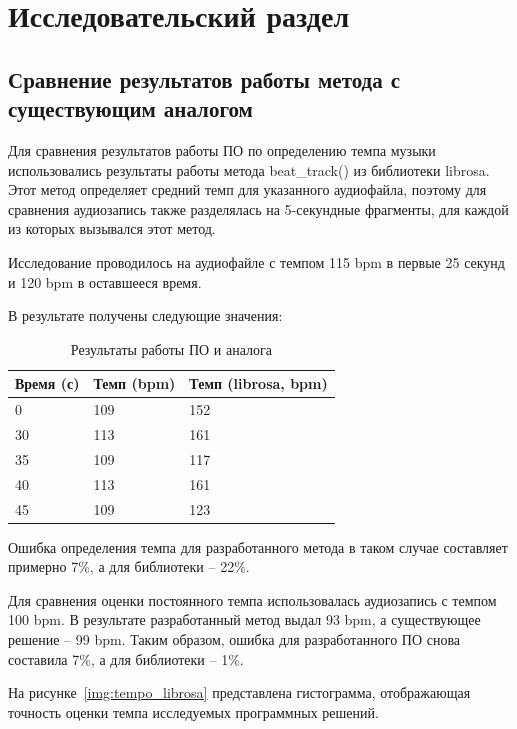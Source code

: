 \section{Исследовательский раздел}

\subsection{Сравнение результатов работы метода с существующим аналогом}

Для сравнения результатов работы ПО по определению темпа музыки использовались результаты работы метода beat\_track() из библиотеки librosa. Этот метод определяет средний темп для указанного аудиофайла, поэтому для сравнения аудиозапись также разделялась на 5-секундные фрагменты, для каждой из которых вызывался этот метод.

Исследование проводилось на аудиофайле с темпом 115 bpm в первые 25 секунд и 120 bpm в оставшееся время.

В результате получены следующие значения:

\begin{table}[!h]
	\begin{center}
		\caption{\label{tab:compare_res}Результаты работы ПО и аналога}
		\begin{tabular}{|p{3.5cm}|p{6cm}|p{6cm}|}
			\hline
			Время (с) & Темп (bpm) & Темп (librosa, bpm)\\
			\hline
			0 & 109 & 152\\
			\hline
			30 & 113 & 161\\
			\hline
			35 & 109 & 117\\
			\hline
			40 & 113 & 161\\
			\hline
			45 & 109 & 123\\
			\hline
		\end{tabular}
	\end{center}
\end{table}

Ошибка определения темпа для разработанного метода в таком случае составляет примерно 7\%, а для библиотеки -- 22\%.

Для сравнения оценки постоянного темпа использовалась аудиозапись с темпом 100 bpm. В результате разработанный метод выдал 93 bpm, а существующее решение -- 99 bpm. Таким образом, ошибка для разработанного ПО снова составила 7\%, а для библиотеки -- 1\%.

На рисунке~\ref{img:tempo_librosa} представлена гистограмма, отображающая точность оценки темпа исследуемых программных решений.


